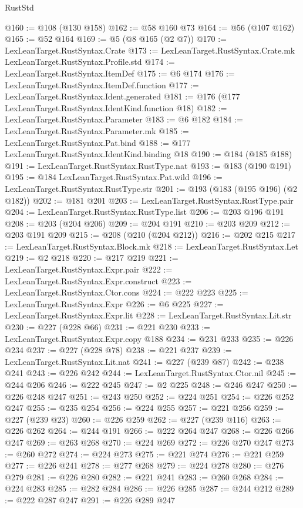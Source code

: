 \begin{lexlean}{RustStd}
\begin{coremodule}
{\begin{coremodule}
{{{{{@160 := @108 (@130 @158)
@162 := @58 @160 @73
@164 := @56 (@107 @162)
@165 := @52 @164
@169 := @5 (@8 @165 (@2 @7))
@170 := LexLeanTarget.RustSyntax.Crate
@173 := LexLeanTarget.RustSyntax.Crate.mk LexLeanTarget.RustSyntax.Profile.std
@174 := LexLeanTarget.RustSyntax.ItemDef
@175 := @6 @174
@176 := LexLeanTarget.RustSyntax.ItemDef.function
@177 := LexLeanTarget.RustSyntax.Ident.generated
@181 := @176 (@177 LexLeanTarget.RustSyntax.IdentKind.function @18)
@182 := LexLeanTarget.RustSyntax.Parameter
@183 := @6 @182
@184 := LexLeanTarget.RustSyntax.Parameter.mk
@185 := LexLeanTarget.RustSyntax.Pat.bind
@188 := @177 LexLeanTarget.RustSyntax.IdentKind.binding @18
@190 := @184 (@185 @188)
@191 := LexLeanTarget.RustSyntax.RustType.nat
@193 := @183 (@190 @191)
@195 := @184 LexLeanTarget.RustSyntax.Pat.wild
@196 := LexLeanTarget.RustSyntax.RustType.str
@201 := @193 (@183 (@195 @196) (@2 @182))
@202 := @181 @201
@203 := LexLeanTarget.RustSyntax.RustType.pair
@204 := LexLeanTarget.RustSyntax.RustType.list
@206 := @203 @196 @191
@208 := @203 (@204 @206)
@209 := @204 @191
@210 := @203 @209
@212 := @203 @191 @209
@215 := @208 (@210 (@204 @212))
@216 := @202 @215
@217 := LexLeanTarget.RustSyntax.Block.mk
@218 := LexLeanTarget.RustSyntax.Let
@219 := @2 @218
@220 := @217 @219
@221 := LexLeanTarget.RustSyntax.Expr.pair
@222 := LexLeanTarget.RustSyntax.Expr.construct
@223 := LexLeanTarget.RustSyntax.Ctor.cons
@224 := @222 @223
@225 := LexLeanTarget.RustSyntax.Expr
@226 := @6 @225
@227 := LexLeanTarget.RustSyntax.Expr.lit
@228 := LexLeanTarget.RustSyntax.Lit.str
@230 := @227 (@228 @66)
@231 := @221 @230
@233 := LexLeanTarget.RustSyntax.Expr.copy @188
@234 := @231 @233
@235 := @226 @234
@237 := @227 (@228 @78)
@238 := @221 @237
@239 := LexLeanTarget.RustSyntax.Lit.nat
@241 := @227 (@239 @87)
@242 := @238 @241
@243 := @226 @242
@244 := LexLeanTarget.RustSyntax.Ctor.nil
@245 := @244 @206
@246 := @222 @245
@247 := @2 @225
@248 := @246 @247
@250 := @226 @248 @247
@251 := @243 @250
@252 := @224 @251
@254 := @226 @252 @247
@255 := @235 @254
@256 := @224 @255
@257 := @221 @256
@259 := @227 (@239 @23)
@260 := @226 @259
@262 := @227 (@239 @116)
@263 := @226 @262
@264 := @244 @191
@266 := @222 @264 @247
@268 := @226 @266 @247
@269 := @263 @268
@270 := @224 @269
@272 := @226 @270 @247
@273 := @260 @272
@274 := @224 @273
@275 := @221 @274
@276 := @221 @259
@277 := @226 @241
@278 := @277 @268
@279 := @224 @278
@280 := @276 @279
@281 := @226 @280
@282 := @221 @241
@283 := @260 @268
@284 := @224 @283
@285 := @282 @284
@286 := @226 @285
@287 := @244 @212
@289 := @222 @287 @247
@291 := @226 @289 @247
}}}}}
\end{coremodule}}
\end{coremodule}
\end{lexlean}
